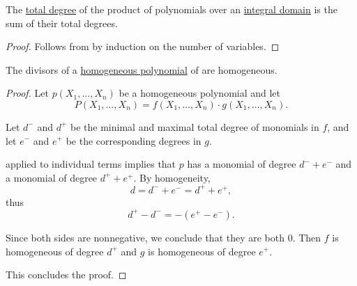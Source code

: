\begin{proposition}\label{thm:degree_of_multivariate_polynomial_product}
  The \hyperref[def:polynomial_degree]{total degree} of the product of polynomials over an \hyperref[def:integral_domain]{integral domain} is the sum of their total degrees.
\end{proposition}
\begin{proof}
  Follows from  by induction on the number of variables.
\end{proof}

\begin{proposition}\label{thm:divisors_of_homogeneous_polynomial}
  The divisors of a \hyperref[def:homogeneous_polynomial]{homogeneous polynomial} of are homogeneous.
\end{proposition}
\begin{proof}
  Let \( p(X_1, \ldots, X_n) \) be a homogeneous polynomial and let
  \begin{equation*}
    P(X_1, \ldots, X_n) = f(X_1, \ldots, X_n) \cdot g(X_1, \ldots, X_n).
  \end{equation*}

  Let \( d^- \) and \( d^+ \) be the minimal and maximal total degree of monomials in \( f \), and let \( e^- \) and \( e^+ \) be the corresponding degrees in \( g \).

   applied to individual terms implies that \( p \) has a monomial of degree \( d^- + e^- \) and a monomial of degree \( d^+ + e^+ \). By homogeneity,
  \begin{equation*}
    d = d^- + e^- = d^+ + e^+,
  \end{equation*}
  thus
  \begin{equation*}
    d^+ - d^- = - (e^+ - e^-).
  \end{equation*}

  Since both sides are nonnegative, we conclude that they are both \( 0 \). Then \( f \) is homogeneous of degree \( d^+ \) and \( g \) is homogeneous of degree \( e^+ \).

  This concludes the proof.
\end{proof}

